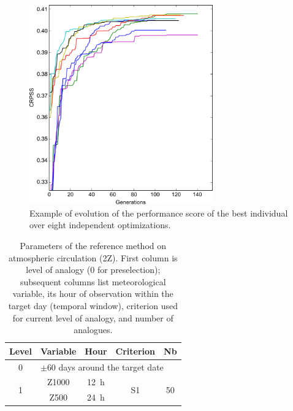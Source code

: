 \documentclass[review]{elsarticle}
\begin{document}
\begin{figure}[t]
	\centerline{\includegraphics[width=7.9cm]{fig11.pdf}}
	\caption{Example of evolution of the performance score of the best individual over eight independent optimizations.}
	\label{fig:evolution}
\end{figure}

\clearpage


\begin{table}[t]
	\caption{Parameters of the reference method on atmospheric circulation (2Z). First column is level of analogy (0 for preselection); subsequent columns list meteorological variable, its hour of observation within the target day (temporal window), criterion used for current level of analogy, and number of analogues.}
	\footnotesize
	\begin{center}
		\begin{tabular}{ccccc}
			\hline
			Level & Variable & Hour & Criterion & Nb \\ 
			\hline 
			0 & \multicolumn{4}{l}{$\pm 60$ days around the target date} \\
			\hline 
			\multirow{2}{*}{1} & Z1000 & 12~h & \multirow{2}{*}{S1} & \multirow{2}{*}{50} \\
			& Z500 & 24~h & & \\ 
			\hline 
		\end{tabular} 
	\end{center}
	\label{table:params_R1}
\end{table}
\end{document}
